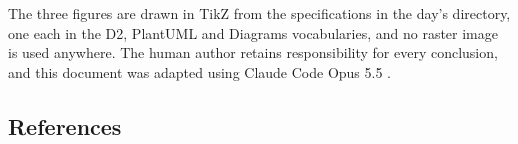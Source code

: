 The three figures are drawn in TikZ from the specifications in the day's
 directory, one each in the D2, PlantUML and Diagrams
vocabularies, and no raster image is used anywhere. The human author retains
responsibility for every conclusion, and this document was adapted using Claude
Code Opus 5.5 \cite{repo2026}.

\subsection{References}

\begin{apprefs}
\nocite{*}


\end{apprefs}
